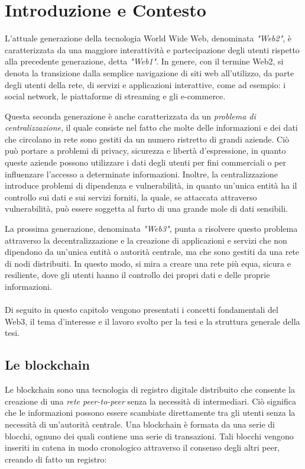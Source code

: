 \chapter{Introduzione e Contesto}
L'attuale generazione della tecnologia World Wide Web, denominata \textit{"Web2"}, è caratterizzata da una maggiore interattività e partecipazione degli utenti rispetto alla precedente generazione, detta \textit{"Web1"}. In genere, con il termine Web2, si denota la transizione dalla semplice navigazione di siti web all'utilizzo, da parte degli utenti della rete, di servizi e applicazioni interattive, come ad esempio: i social network, le piattaforme di streaming e gli e-commerce.

Questa seconda generazione è anche caratterizzata da un \textit{problema di centralizzazione}, il quale consiste nel fatto che molte delle informazioni e dei dati che circolano in rete sono gestiti da un numero ristretto di grandi aziende. Ciò può portare a problemi di privacy, sicurezza e libertà d'espressione, in quanto queste aziende possono utilizzare i dati degli utenti per fini commerciali o per influenzare l'accesso a determinate informazioni. Inoltre, la centralizzazione introduce problemi di dipendenza e vulnerabilità, in quanto un'unica entità ha il controllo sui dati e sui servizi forniti, la quale, se attaccata attraverso vulnerabilità, può essere soggetta al furto di una grande mole di dati sensibili.

La prossima generazione, denominata \textit{"Web3"}, punta a risolvere questo problema attraverso la decentralizzazione e la creazione di applicazioni e servizi che non dipendono da un'unica entità o autorità centrale, ma che sono gestiti da una rete di nodi distribuiti. In questo modo, si mira a creare una rete più equa, sicura e resiliente, dove gli utenti hanno il controllo dei propri dati e delle proprie informazioni.\\
\\
Di seguito in questo capitolo vengono presentati i concetti fondamentali del Web3, il tema d'interesse e il lavoro svolto per la tesi e la struttura generale della tesi.

\section{Le blockchain}
Le blockchain sono una tecnologia di registro digitale distribuito che consente la creazione di una \textit{rete peer-to-peer} senza la necessità di intermediari. Ciò significa che le informazioni possono essere scambiate direttamente tra gli utenti senza la necessità di un'autorità centrale.
Una blockchain è formata da una serie di blocchi, ognuno dei quali contiene una serie di transazioni. Tali blocchi vengono inseriti in catena in modo cronologico attraverso il consenso degli altri peer, creando di fatto un registro:

